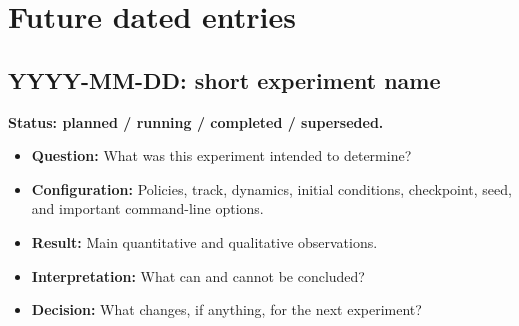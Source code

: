\documentclass[11pt]{article}
\newcommand{\status}[1]{\textcolor{blue!65!black}{\textbf{#1}}}
\begin{document}
\section{Future dated entries}

\subsection*{YYYY-MM-DD: short experiment name}

\status{Status: planned / running / completed / superseded.}

\begin{itemize}
  \item \textbf{Question:} What was this experiment intended to determine?
  \item \textbf{Configuration:} Policies, track, dynamics, initial conditions,
  checkpoint, seed, and important command-line options.
  \item \textbf{Result:} Main quantitative and qualitative observations.
  \item \textbf{Interpretation:} What can and cannot be concluded?
  \item \textbf{Decision:} What changes, if anything, for the next experiment?
\end{itemize}
\end{document}
